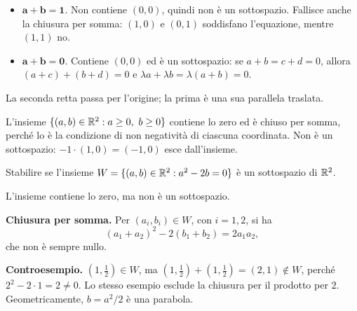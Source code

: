 \begin{esempio}
\leavevmode
\begin{itemize}
  \item $\boldsymbol{a+b=1}$. Non contiene $(0,0)$, quindi non è un sottospazio. Fallisce anche la chiusura per somma: $(1,0)$ e $(0,1)$ soddisfano l'equazione, mentre $(1,1)$ no.
  \item $\boldsymbol{a+b=0}$. Contiene $(0,0)$ ed è un sottospazio: se $a+b=c+d=0$, allora $(a+c)+(b+d)=0$ e $\lambda a+\lambda b=\lambda(a+b)=0$.
\end{itemize}
La seconda retta passa per l'origine; la prima è una sua parallela traslata.
\end{esempio}
\begin{schema}
\end{schema}

\begin{esempio}
L'insieme $\{(a,b)\in\R^2:a\ge0,\ b\ge0\}$ contiene lo zero ed è chiuso per somma, perché lo è la condizione di non negatività di ciascuna coordinata. Non è un sottospazio: $-1\cdot(1,0)=(-1,0)$ esce dall'insieme.
\end{esempio}

\begin{esercizio}
Stabilire se l'insieme $W=\{(a,b)\in\mathbb{R}^2:a^2-2b=0\}$ è un sottospazio di $\mathbb{R}^2$.
\end{esercizio}
\begin{svolgimento}
L'insieme contiene lo zero, ma non è un sottospazio.

\textbf{Chiusura per somma.} Per $(a_i,b_i)\in W$, con $i=1,2$, si ha
\[
  (a_1+a_2)^2-2(b_1+b_2)=2a_1a_2,
\]
che non è sempre nullo.

\textbf{Controesempio.} $(1,\tfrac12)\in W$, ma $(1,\tfrac12)+(1,\tfrac12)=(2,1)\notin W$, perché $2^2-2\cdot1=2\ne0$. Lo stesso esempio esclude la chiusura per il prodotto per $2$. Geometricamente, $b=a^2/2$ è una parabola.
\end{svolgimento}

